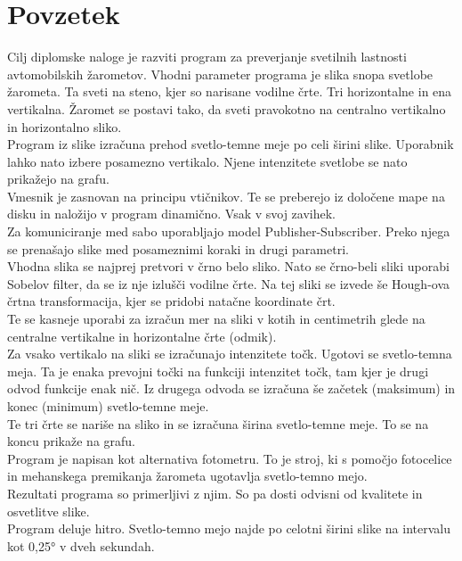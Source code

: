 \documentclass[oneside, a4paper, 12pt]{book}
\renewcommand{\chaptermark}[1]%
{\markboth{\MakeUppercase{\thechapter.\ #1}}{}} \renewcommand{\sectionmark}[1]%
\newcommand{\clearemptydoublepage}{\newpage{\pagestyle{empty}\cleardoublepage}}
\begin{document}
\clearemptydoublepage

\chapter*{Povzetek}
\chaptermark{}
Cilj diplomske naloge je razviti program za preverjanje svetilnih lastnosti avtomobilskih žarometov. Vhodni parameter programa je slika snopa svetlobe žarometa. Ta sveti na steno, kjer so narisane vodilne črte. Tri horizontalne in ena vertikalna. Žaromet se postavi tako, da sveti pravokotno na centralno vertikalno in horizontalno sliko. \\
Program iz slike izračuna prehod svetlo-temne meje po celi širini slike. Uporabnik lahko nato izbere posamezno vertikalo. Njene intenzitete svetlobe se nato prikažejo na grafu.\\
Vmesnik je zasnovan na principu vtičnikov. Te se preberejo iz določene mape na disku in naložijo v program dinamično. Vsak v svoj zavihek.\\
Za komuniciranje med sabo uporabljajo model Publisher-Subscriber. Preko njega se prenašajo slike med posameznimi koraki in drugi parametri.\\
Vhodna slika se najprej pretvori v črno belo sliko. Nato se črno-beli sliki uporabi Sobelov filter, da se iz nje izlušči vodilne črte. Na tej sliki se izvede še Hough-ova črtna transformacija, kjer se pridobi natačne koordinate črt.\\
Te se kasneje uporabi za izračun mer na sliki v kotih in centimetrih glede na centralne vertikalne in horizontalne črte (odmik).\\
Za vsako vertikalo na sliki se izračunajo intenzitete točk. Ugotovi se svetlo-temna meja. Ta je enaka prevojni točki na funkciji intenzitet točk, tam kjer je drugi odvod funkcije enak nič. Iz drugega odvoda se izračuna še začetek (maksimum) in konec (minimum) svetlo-temne meje.\\
Te tri črte se nariše na sliko in se izračuna širina svetlo-temne meje. To se na koncu prikaže na grafu.\\
Program je napisan kot alternativa fotometru. To je stroj, ki s pomočjo fotocelice in mehanskega premikanja žarometa ugotavlja svetlo-temno mejo.\\
Rezultati programa so primerljivi z njim. So pa dosti odvisni od kvalitete in osvetlitve slike.\\
Program deluje hitro. Svetlo-temno mejo najde po celotni širini slike na intervalu kot 0,25° v dveh sekundah.
\clearemptydoublepage
\end{document}
